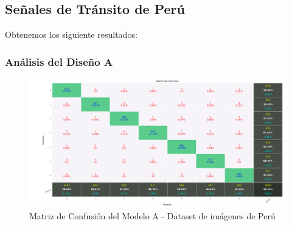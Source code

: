 	
	\subsection{Señales de Tránsito de Perú}

		Obtenemos los siguiente resultados:
	 	\subsubsection{Análisis del Diseño A}  
			\begin{figure}[H]
				\begin{center}
				\includegraphics[width=1\textwidth]{images/desarrollo/testResults/model_P_A} 
				\end{center}
				\begin{center}
				\caption{\small{Matriz de Confusión del Modelo A - Dataset de imágenes de Perú}}
				\vspace{-1em}
				{\small{\fontsize{10}{16.8}\selectfont {Fuente propia}}}
				\end{center}
				\vspace{-1.5em}
			\end{figure}